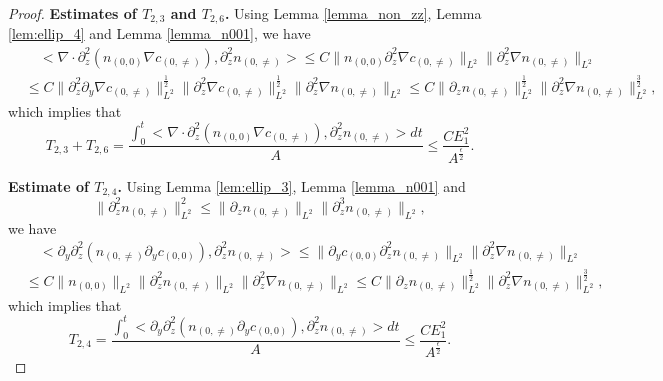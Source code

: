 \documentclass[12pt, reqno]{amsart}
\numberwithin{equation}{section}
\begin{document}
\begin{proof}
		{\bf Estimates of $T_{2,3}$ and $T_{2,6}$.} 
		Using Lemma \ref{lemma_non_zz}, Lemma \ref{lem:ellip_4}
		and Lemma \ref{lemma_n001}, 
		we have 
		\begin{equation*}
			\begin{aligned}
				&\quad <\nabla\cdot\partial_z^2(n_{(0,0)}\nabla c_{(0,\neq)})
				,\partial_z^2 n_{(0,\neq)}>
				\leq C\|n_{(0,0)}\partial_z^2\nabla c_{(0,\neq)}\|_{L^2}
				\|\partial_z^2 \nabla n_{(0,\neq)}\|_{L^2}\\
				&\leq C
				\|\partial_z^2\partial_y\nabla c_{(0,\neq)}\|_{L^2}^{\frac12}
				\|\partial_z^2\nabla c_{(0,\neq)}\|_{L^2}^{\frac12}
				\|\partial_z^2 \nabla n_{(0,\neq)}\|_{L^2}\leq C
				\|\partial_z n_{(0,\neq)}\|_{L^2}^{\frac12}
				\|\partial_z^2 \nabla n_{(0,\neq)}\|_{L^2}^{\frac32},
			\end{aligned}
		\end{equation*}
		which implies that 
		\begin{equation*}
			T_{2,3}+T_{2,6}
			=\frac{\int_0^t<\nabla\cdot\partial_z^2(n_{(0,0)}
				\nabla c_{(0,\neq)}),\partial_z^2 n_{(0,\neq)}>dt}{A}
			\leq \frac{CE_1^2}{A^{\frac{\epsilon}{2}}}.
		\end{equation*}
		
		{\bf Estimate of $T_{2,4}$.} 
		Using Lemma \ref{lem:ellip_3}, Lemma \ref{lemma_n001}
		and \begin{equation*}
			\|\partial_z^2n_{(0,\neq)}\|_{L^2}^2
			\leq \|\partial_zn_{(0,\neq)}\|_{L^2}
			\|\partial_z^3n_{(0,\neq)}\|_{L^2},
		\end{equation*}
		we have
		\begin{equation*}
			\begin{aligned}
				&\quad 	<\partial_y\partial_z^2(n_{(0,\neq)}\partial_{y}c_{(0,0)}),
				\partial_z^2n_{(0,\neq)}>
				\leq 
				\|\partial_{y}c_{(0,0)}\partial_z^2n_{(0,\neq)}\|_{L^2}
				\|\partial_z^2\nabla n_{(0,\neq)}\|_{L^2}\\
				&\leq C\|n_{(0,0)}\|_{L^2}\|\partial_z^2n_{(0,\neq)}\|_{L^2}
				\|\partial_z^2\nabla n_{(0,\neq)}\|_{L^2}
				\leq C\|\partial_zn_{(0,\neq)}\|_{L^2}^{\frac12}
				\|\partial_z^2\nabla n_{(0,\neq)}\|_{L^2}^{\frac32},
			\end{aligned}
		\end{equation*}
		which implies that 
		\begin{equation*}
			T_{2,4}=
			\frac{\int_0^t<\partial_y\partial_z^2(n_{(0,\neq)}
				\partial_{y}c_{(0,0)}),\partial_z^2n_{(0,\neq)}>dt}{A}
			\leq \frac{CE_1^2}{A^{\frac{\epsilon}{2}}}.
		\end{equation*}
		

\end{proof}
\end{document}
